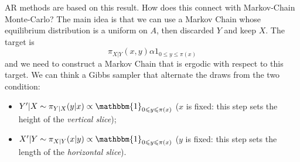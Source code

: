 \documentclass{article}
\begin{document}
	AR methods are based on this result. 
	How does this connect with Markov-Chain Monte-Carlo? The main idea is that we can use  a Markov Chain whose equilibrium distribution is a uniform on $A$, then discarded $Y$ and keep $X$. The target is \[\pi_{X|Y}(x,y) \alpha 1_{0 \leqslant y \leqslant \pi(x)} \] and we need to construct a Markov Chain that is ergodic with respect to this target.  We can think a Gibbs sampler that alternate the draws from the two condition:
	\begin{itemize}
		\item $Y'|X\sim \pi_{Y|X}(y|x)\propto\mathbbm{1}_{0\leqslant y\leqslant\pi(x)}$ ($x$ is fixed: this step sets the height of the \textit{vertical slice});
		\item $X'|Y\sim \pi_{X|Y}(x|y)\propto\mathbbm{1}_{0\leqslant y\leqslant\pi(x)}$ ($y$ is fixed: this step sets the length of the \textit{horizontal slice}).
	\end{itemize}
\end{document}
